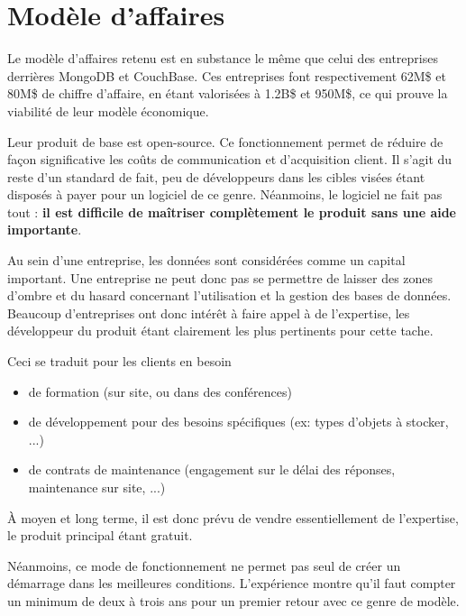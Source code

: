 \documentclass[a4paper,10pt]{scrreprt}
\begin{document}
    \section{Modèle d'affaires}
    
    
    Le modèle d'affaires retenu est en substance le même que celui des entreprises derrières MongoDB et CouchBase. Ces entreprises font respectivement 62M\$ et 80M\$ de chiffre d'affaire, en étant valorisées à 1.2B\$ et 950M\$, ce qui prouve la viabilité de leur modèle économique.
    
    Leur produit de base est open-source. Ce fonctionnement permet de réduire de façon significative les coûts de communication et d'acquisition client. Il s'agit du reste d'un standard de fait, peu de développeurs dans les cibles visées étant disposés à payer pour un logiciel de ce genre. Néanmoins, le logiciel ne fait pas tout : \textbf{il est difficile de maîtriser complètement le produit sans une aide importante}.
    
    \medskip
    Au sein d'une entreprise, les données sont considérées comme un capital important. Une entreprise ne peut donc pas se permettre de laisser des zones d'ombre et du hasard concernant l'utilisation et la gestion des bases de données. Beaucoup d'entreprises ont donc intérêt à faire appel à de l'expertise, les développeur du produit étant clairement les plus pertinents pour cette tache.

    Ceci se traduit pour les clients en besoin
    \begin{itemize}
        \item de formation (sur site, ou dans des conférences)
        \item de développement pour des besoins spécifiques (ex: types d'objets à stocker, ...)
        \item de contrats de maintenance (engagement sur le délai des réponses, maintenance sur site, ...)
    \end{itemize}

    À moyen et long terme, il est donc prévu de vendre essentiellement de l'expertise, le produit principal étant gratuit.
    
    \medskip
    Néanmoins, ce mode de fonctionnement ne permet pas seul de créer un démarrage dans les meilleures conditions. L'expérience montre qu'il faut compter un minimum de deux à trois ans pour un premier retour avec ce genre de modèle.
    
\end{document}
